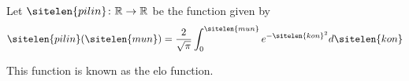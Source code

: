 \documentclass{article}
\begin{document}
	Let $\sitelen{pilin} \colon \mathbb R \to \mathbb R$ be the function given by
	\[ \sitelen{pilin}(\sitelen{mun}) = \frac{2}{\sqrt \pi} \int_0^{\sitelen{mun}} e^{-\sitelen{kon}^2} d \sitelen{kon} \]

	This function is known as the {\sitelenpona elo} function.
\end{document}
